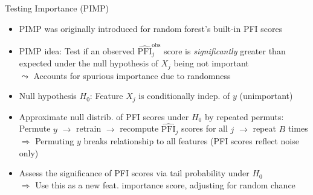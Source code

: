 \documentclass[10pt,compress,t,notes=noshow, xcolor=table]{beamer}
\begin{document}
\begin{frame}{Testing Importance (PIMP) }

\begin{itemize}[<+->]
  \item PIMP was originally introduced for random forest's built-in PFI scores
  \item PIMP idea: Test if an observed $\widehat{\text{PFI}}_j^{\text{obs}}$ score is \emph{significantly} greater than expected under the null hypothesis of $X_j$ being not important\\
  $\leadsto$ Accounts for spurious importance due to randomness
 \item Null hypothesis $H_0$: Feature $X_j$ is conditionally indep. of $y$ (unimportant)
  \item Approximate null distrib. of PFI scores under $H_0$ by repeated permuts:\\
  Permute $y$ $\rightarrow$ retrain $\rightarrow$ recompute $\widehat{\text{PFI}}_j$ scores for all $j$ $\rightarrow$ repeat $B$ times\\
  $\Rightarrow$ Permuting $y$ breaks relationship to all features (PFI scores reflect noise only)%
  \item %
  Assess the significance of PFI scores via tail probability under $H_0$\\
    $\Rightarrow$ Use this as a new feat. importance score, adjusting for random chance
\end{itemize}


\end{frame}
\end{document}
